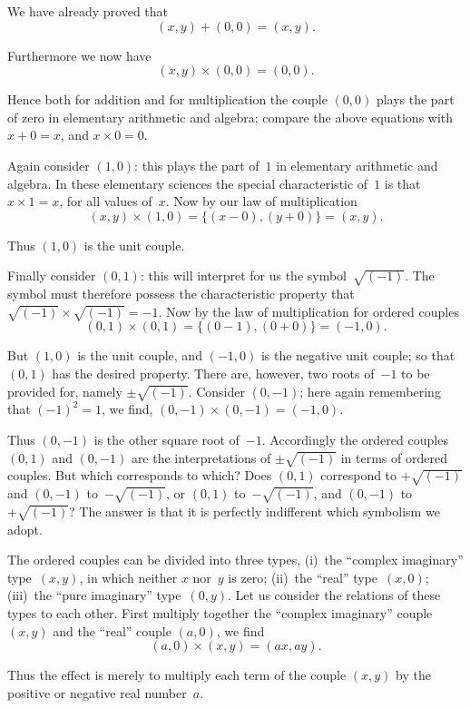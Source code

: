 \documentclass[12pt,leqno]{book}[2005/09/16]
\newcommand{\Typo}[2]{#2}
\newcommand{\PageSep}[1]{\ignorespaces}
\begin{document}
We have already proved that
\[
(x, y) + (0, 0) = (x, y).
\]

Furthermore we now have
\[
(x, y) × (0, 0) = (0, 0).
\]

Hence both for addition and for multiplication
the couple $(0, 0)$ plays the part of zero in
elementary arithmetic and algebra; compare
the above equations with $x + 0 = x$, and
$x × 0 = 0$.

Again consider $(1, 0)$: this plays the part
of~$1$ in elementary arithmetic and algebra.
In these elementary sciences the special
characteristic of~$1$ is that $x × 1 = x$, for all
values of~$x$. Now by our law of multiplication
\[
(x, y) × (1, 0) = \{(x - 0), (y + 0)\} = (x, y).
\]

Thus $(1, 0)$ is the unit couple.
\PageSep{104}

Finally consider $(0, 1)$: this will interpret
for us the symbol~$\sqrt{(-1)}$. The symbol must
therefore possess the characteristic property
that $\sqrt{(-1)} × \sqrt{(-1)} = -1$. Now by the
law of multiplication for ordered couples
\[
(0, 1) × (0, 1) = \{(0 - 1), (0 + 0)\} = (-1, 0).
\]

But $(1, 0)$ is the unit couple, and $(-1, 0)$
is the negative unit couple; so that $(0, 1)$ has
the desired property. There are, however,
two roots of~$-1$ to be provided for, namely
$±\sqrt{(-1)}$. Consider $(0, -1)$; here again remembering
that $(-1)^{2} = 1$, we find, $(0, -1) × (0, -1) = (-1, 0)$.

Thus $(0, -1)$ is the other square root of~$\Typo{\sqrt{(-1)}}{-1}$.
Accordingly the ordered couples
$(0, 1)$ and $(0, -1)$ are the interpretations of
$±\sqrt{(-1)}$ in terms of ordered couples. But
which corresponds to which? Does $(0, 1)$
correspond to $+\sqrt{(-1)}$ and $(0, -1)$ to~$-\sqrt{(-1)}$,
or $(0, 1)$ to~$-\sqrt{(-1)}$, and $(0, -1)$
to~$+\sqrt{(-1)}$? The answer is that it is perfectly
indifferent which symbolism we adopt.

The ordered couples can be divided into
three types, (i)~the ``complex imaginary''
type~$(x, y)$, in which neither $x$ nor~$y$ is zero;
(ii)~the ``real'' type~$(x, 0)$; (iii)~the ``pure
imaginary'' type~$(0, y)$. Let us consider the
relations of these types to each other. First
multiply together the ``complex imaginary''
\PageSep{105}
couple $(x, y)$ and the ``real'' couple $(a, 0)$, we
find
\[
(a, 0) × (x, y) = (ax, ay).
\]

Thus the effect is merely to multiply each
term of the couple $(x, y)$ by the positive or
negative real number~$a$.
\end{document}
